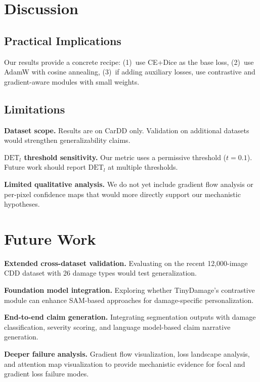 \documentclass[10pt,twocolumn]{article}
\begin{document}
\section{Discussion}
\label{sec:discussion}

\subsection{Practical Implications}

Our results provide a concrete recipe: (1)~use CE+Dice as the base loss, (2)~use AdamW with cosine annealing, (3)~if adding auxiliary losses, use contrastive and gradient-aware modules with small weights.

\subsection{Limitations}

\textbf{Dataset scope.} Results are on CarDD only. Validation on additional datasets would strengthen generalizability claims.

\textbf{$\text{DET}_l$ threshold sensitivity.} Our metric uses a permissive threshold ($t=0.1$). Future work should report $\text{DET}_l$ at multiple thresholds.

\textbf{Limited qualitative analysis.} We do not yet include gradient flow analysis or per-pixel confidence maps that would more directly support our mechanistic hypotheses.

\section{Future Work}
\label{sec:future}

\textbf{Extended cross-dataset validation.} Evaluating on the recent 12,000-image CDD dataset with 26 damage types would test generalization.

\textbf{Foundation model integration.} Exploring whether TinyDamage's contrastive module can enhance SAM-based approaches for damage-specific personalization.

\textbf{End-to-end claim generation.} Integrating segmentation outputs with damage classification, severity scoring, and language model-based claim narrative generation.

\textbf{Deeper failure analysis.} Gradient flow visualization, loss landscape analysis, and attention map visualization to provide mechanistic evidence for focal and gradient loss failure modes.
\end{document}
